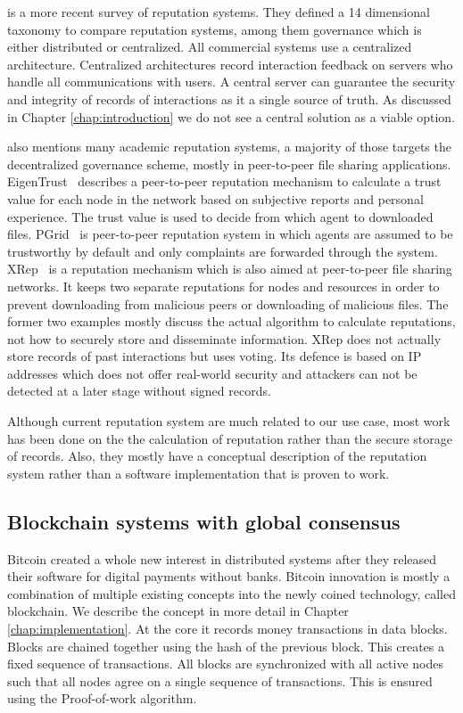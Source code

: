 \cite{HENDRIKX2015184} is a more recent survey of reputation systems. They defined a 14 dimensional
taxonomy to compare reputation systems, among them governance which is either distributed or 
centralized. All commercial systems use a centralized
architecture. Centralized architectures record interaction feedback on servers who handle all 
communications with users. A central server can guarantee the security and integrity of records of
interactions as it a single source of truth. As discussed in Chapter \ref{chap:introduction} we do
not see a central solution as a viable option. 

\cite{HENDRIKX2015184} also mentions many academic reputation systems, a majority of those targets 
the decentralized governance scheme, mostly in peer-to-peer file sharing applications. 
EigenTrust~\cite{kamvar2003eigentrust} describes a peer-to-peer reputation mechanism to calculate a trust value for each 
node in the network based on subjective reports and personal experience. The trust value is used 
to decide from which agent to downloaded files. PGrid~\cite{aberer2003p} is peer-to-peer reputation
system in which agents are assumed to be trustworthy by default and only complaints are forwarded 
through the system. XRep~\cite{damiani2002xrep} is a reputation mechanism which is also aimed at 
peer-to-peer file sharing networks. It keeps two separate reputations for nodes and resources in
order to prevent downloading from malicious peers or downloading of malicious files. The former two
examples mostly discuss the actual algorithm to calculate reputations, not how to securely store and
disseminate information. XRep does not actually store records of past interactions but uses voting.
Its defence is based on IP addresses which does not offer real-world security and attackers can not
be detected at a later stage without signed records.

Although current reputation system are much related to our use case, most work has been done on the 
the calculation of reputation rather than the secure storage of records. Also, they mostly have a
conceptual description of the reputation system rather than a software implementation that is proven
to work.

\subsection{Blockchain systems with global consensus}
Bitcoin\cite{nakamoto2008bitcoin} created a whole new interest in distributed systems after they 
released their software for digital payments without banks. Bitcoin innovation is mostly a combination of
multiple existing concepts into the newly coined technology, called blockchain. We describe the 
concept in more detail in Chapter \ref{chap:implementation}. At the core it records money transactions
in data blocks. Blocks are chained together using the hash of the previous block. This creates a 
fixed sequence of transactions. All blocks are synchronized with all active nodes such that all nodes
agree on a single sequence of transactions. This is ensured using the Proof-of-work algorithm.

